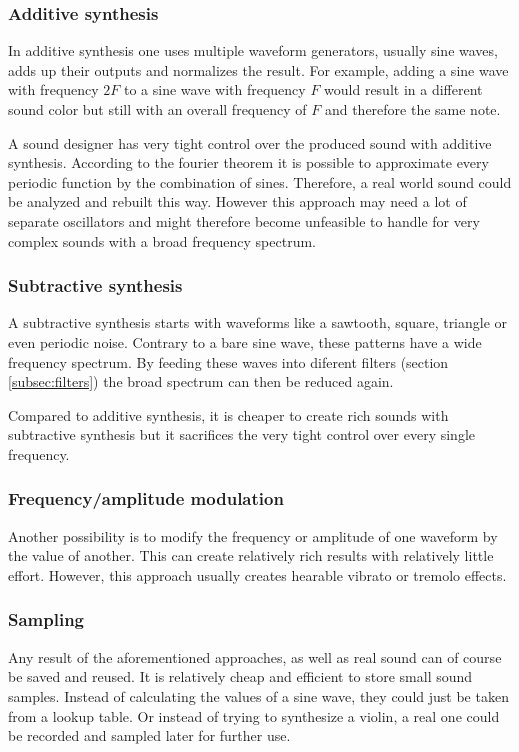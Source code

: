 		\subsubsection{Additive synthesis}
			In additive synthesis one uses multiple waveform generators, usually sine waves, adds up their outputs and normalizes the result.
			For example, adding a sine wave with frequency $2F$ to a sine wave with frequency $F$ would result in a different sound color but still with an overall frequency of $F$ and therefore the same note.
			
			A sound designer has very tight control over the produced sound with additive synthesis.
			According to the fourier theorem it is possible to approximate every periodic function by the combination of sines. 
			Therefore, a real world sound could be analyzed and rebuilt this way.
			However this approach may need a lot of separate oscillators and might therefore become unfeasible to handle for very complex sounds with a broad frequency spectrum.
		\subsubsection{Subtractive synthesis}
			A subtractive synthesis starts with waveforms like a sawtooth, square, triangle or even periodic noise.
			Contrary to a bare sine wave, these patterns have a wide frequency spectrum. 
			By feeding these waves into diferent filters (section \ref{subsec:filters}) the broad spectrum can then be reduced again. 
			
			Compared to additive synthesis, it is cheaper to create rich sounds with subtractive synthesis but it sacrifices the very tight control over every single frequency.
		\subsubsection{Frequency/amplitude modulation}
			Another possibility is to modify the frequency or amplitude of one waveform by the value of another.
			This can create relatively rich results with relatively little effort.
			However, this approach usually creates hearable vibrato or tremolo effects.
		\subsubsection{Sampling}
			Any result of the aforementioned approaches, as well as real sound can of course be saved and reused.
			It is relatively cheap and efficient to store small sound samples. 
			Instead of calculating the values of a sine wave, they could just be taken from a lookup table.
			Or instead of trying to synthesize a violin, a real one could be recorded and sampled later for further use.
			
